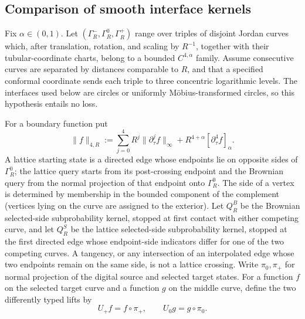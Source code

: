 \subsection{Comparison of smooth interface kernels}

Fix $\alpha\in(0,1)$.  Let
$(\Gamma_R^-,\Gamma_R^0,\Gamma_R^+)$ range over triples of
disjoint Jordan curves which, after translation, rotation, and scaling
by $R^{-1}$, together with their tubular-coordinate charts, belong to
a bounded $C^{4,\alpha}$ family.  Assume consecutive curves are
separated by distances comparable to $R$, and that a specified
conformal coordinate sends each triple to three concentric logarithmic
levels.  The interfaces used below are circles or uniformly
Möbius-transformed circles, so this hypothesis entails no loss.

For a boundary function put
\begin{equation}
\|f\|_{4,R}:=\sum_{j=0}^4R^j\|\partial_\tau^jf\|_\infty
             +R^{4+\alpha}[\partial_\tau^4f]_\alpha .\label{eq:ct-smooth-39a}
\end{equation}
A lattice starting state is a directed edge whose endpoints lie on opposite
sides of $\Gamma_R^0$; the lattice query starts from its post-crossing
endpoint and the Brownian query from the normal projection of that endpoint
onto $\Gamma_R^0$.  The side of a vertex is determined by membership in
the bounded component of the complement (vertices lying on the curve are
assigned to the exterior).  Let $Q_R^B$ be the Brownian selected-side
subprobability kernel, stopped at first contact with either competing curve,
and let $Q_R^S$ be the lattice selected-side subprobability kernel, stopped
at the first directed edge whose endpoint-side indicators differ for one of
the two competing curves.  A tangency, or any intersection of an interpolated
edge whose two endpoints remain on the same side, is not a lattice crossing.
Write $\pi_0,\pi_+$ for normal projection of the digital source
and selected target states.  For a function $f$ on the selected target
curve and a function $g$ on the middle curve, define the two differently
typed lifts by
\[
U_+f=f\circ\pi_+,
                 \qquad U_0g=g\circ\pi_0.
\]
